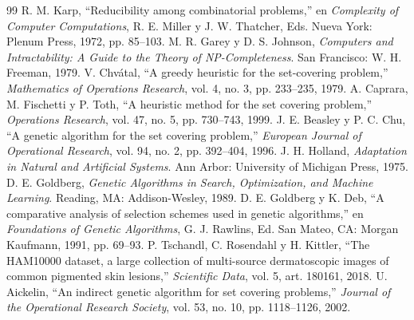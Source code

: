 \documentclass[conference]{IEEEtran}
\begin{document}
\begin{thebibliography}{99}
 R. M. Karp, ``Reducibility among combinatorial problems,'' en \textit{Complexity of Computer Computations}, R. E. Miller y J. W. Thatcher, Eds. Nueva York: Plenum Press, 1972, pp. 85--103.
 M. R. Garey y D. S. Johnson, \textit{Computers and Intractability: A Guide to the Theory of NP-Completeness}. San Francisco: W. H. Freeman, 1979.
 V. Chvátal, ``A greedy heuristic for the set-covering problem,'' \textit{Mathematics of Operations Research}, vol. 4, no. 3, pp. 233--235, 1979.
 A. Caprara, M. Fischetti y P. Toth, ``A heuristic method for the set covering problem,'' \textit{Operations Research}, vol. 47, no. 5, pp. 730--743, 1999.
 J. E. Beasley y P. C. Chu, ``A genetic algorithm for the set covering problem,'' \textit{European Journal of Operational Research}, vol. 94, no. 2, pp. 392--404, 1996.
 J. H. Holland, \textit{Adaptation in Natural and Artificial Systems}. Ann Arbor: University of Michigan Press, 1975.
 D. E. Goldberg, \textit{Genetic Algorithms in Search, Optimization, and Machine Learning}. Reading, MA: Addison-Wesley, 1989.
 D. E. Goldberg y K. Deb, ``A comparative analysis of selection schemes used in genetic algorithms,'' en \textit{Foundations of Genetic Algorithms}, G. J. Rawlins, Ed. San Mateo, CA: Morgan Kaufmann, 1991, pp. 69--93.
 P. Tschandl, C. Rosendahl y H. Kittler, ``The HAM10000 dataset, a large collection of multi-source dermatoscopic images of common pigmented skin lesions,'' \textit{Scientific Data}, vol. 5, art. 180161, 2018.
 U. Aickelin, ``An indirect genetic algorithm for set covering problems,'' \textit{Journal of the Operational Research Society}, vol. 53, no. 10, pp. 1118--1126, 2002.
\end{thebibliography}
\end{document}
